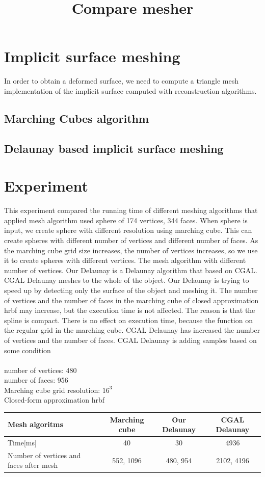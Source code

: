 \documentclass{jsarticle}
\title{Compare mesher}
\begin{document}
\maketitle 
\section*{Implicit surface meshing}
In order to obtain a deformed surface, we need to compute a triangle mesh implementation of the implicit surface computed with reconstruction algorithms.
\subsection*{Marching Cubes algorithm}

\subsection*{Delaunay based implicit surface meshing}

\section*{Experiment}
This experiment compared the running time of different meshing algorithms that applied mesh algorithm used sphere of 174 vertices, 344 faces. When sphere is input, we create sphere with different resolution using marching cube. This can create spheres with different number of vertices and different number of faces. As the marching cube grid size increases, the number of vertices increases, so we use it to create spheres with different vertices. The mesh algorithm with different number of vertices.  Our Delaunay is a Delaunay algorithm that based on CGAL. CGAL Delaunay meshes to the whole of the object. Our Delaunay is trying to speed up by detecting only the surface of the object and meshing it. The number of vertices and the number of faces in the marching cube of closed approximation hrbf may increase, but the execution time is not affected. The reason is that the spline is compact. There is no effect on execution time, because the function on the regular grid in the marching cube. CGAL Delaunay has increased the number of vertices and the number of faces. CGAL Delaunay is adding samples based on some condition\\
\\
\noindent
number of vertices: 480 \\
number of faces: 956 \\
Marching cube grid resolution: $16^3$\\
Closed-form approximation hrbf\\
\begin{table}[htb]
  \begin{tabular}{|l|c|c|c|} \hline
    Mesh algoritms & Marching cube & Our Delaunay & CGAL Delaunay \\  \hline
    Time[ms] & 40 & 30 & 4936\\ \hline
    Number of vertices and faces after mesh & 552, 1096 & 480, 954 &2102, 4196 \\ \hline
  \end{tabular}
\end{table}
\end{document}
